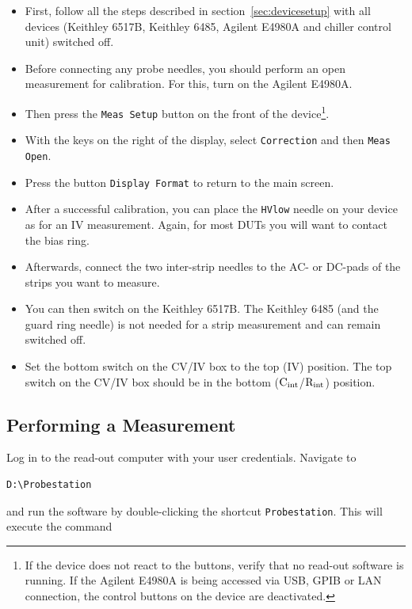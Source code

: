 \documentclass[a4paper]{article}
\begin{document}
\begin{itemize}
\item First, follow all the steps described in section~\ref{sec:devicesetup} with all devices (Keithley 6517B, Keithley 6485, Agilent E4980A and chiller control unit) switched off.
\item Before connecting any probe needles, you should perform an open measurement for calibration. For this, turn on the Agilent E4980A.
\item Then press the {\tt Meas Setup} button on the front of the device\footnote{If the device does not react to the buttons, verify that no read-out software is running. If the Agilent E4980A is being accessed via USB, GPIB or LAN connection, the control buttons on the device are deactivated.}.
\item With the keys on the right of the display, select {\tt Correction} and then {\tt Meas Open}.
\item Press the button {\tt Display Format} to return to the main screen.
\item After a successful calibration, you can place the {\tt HVlow} needle on your device as for an IV measurement. Again, for most DUTs you will want to contact the bias ring.
\item Afterwards, connect the two inter-strip needles to the AC- or DC-pads of the strips you want to measure.
\item You can then switch on the Keithley 6517B.
The Keithley 6485 (and the guard ring needle) is not needed for a strip measurement and can remain switched off.
\item Set the bottom switch on the CV/IV box to the top (IV) position.
The top switch on the CV/IV box should be in the bottom (${\rm C_{int}}$/${\rm R_{int}}$) position.\\
\end{itemize}

\subsection{Performing a Measurement}
\label{sec:ivmeas}

Log in to the read-out computer with your user credentials.
Navigate to

\medskip
\begin{lstlisting}
D:\Probestation
\end{lstlisting}
\medskip

and run the software by double-clicking the shortcut {\tt Probestation}.
This will execute the command
\end{document}

